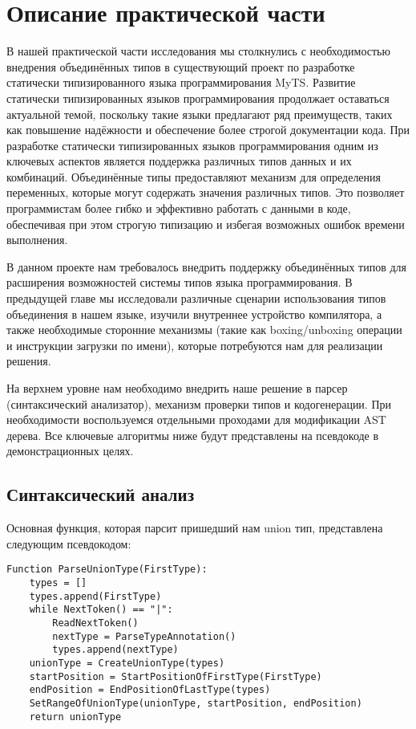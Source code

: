 \section{Описание практической части}
\label{sec:Chapter4} 

В нашей практической части исследования мы столкнулись с необходимостью внедрения объединённых типов в существующий
проект по разработке статически типизированного языка программирования MyTS\@.
Развитие статически типизированных языков программирования продолжает оставаться актуальной темой, поскольку такие
языки предлагают ряд преимуществ, таких как повышение надёжности и обеспечение более строгой документации кода.
При разработке статически типизированных языков программирования одним из ключевых аспектов является поддержка
различных типов данных и их комбинаций.
Объединённые типы предоставляют механизм для определения переменных, которые могут содержать значения различных типов.
Это позволяет программистам более гибко и эффективно работать с данными в коде, обеспечивая при этом строгую типизацию
и избегая возможных ошибок времени выполнения.

В данном проекте нам требовалось внедрить поддержку объединённых типов для расширения возможностей системы типов языка
программирования.
В предыдущей главе мы исследовали различные сценарии использования типов объединения в нашем языке, изучили внутреннее
устройство компилятора, а также необходимые сторонние механизмы (такие как boxing/unboxing операции и инструкции
загрузки по имени), которые потребуются нам для реализации решения.

На верхнем уровне нам необходимо внедрить наше решение в парсер (синтаксический анализатор), механизм проверки типов и
кодогенерации.
При необходимости воспользуемся отдельными проходами для модификации AST дерева.
Все ключевые алгоритмы ниже будут представлены на псевдокоде в демонстрационных целях.

\subsection{Синтаксический анализ}

Основная функция, которая парсит пришедший нам union тип, представлена следующим псевдокодом:

\begin{lstlisting}
Function ParseUnionType(FirstType):
    types = []
    types.append(FirstType)
    while NextToken() == "|":
        ReadNextToken()
        nextType = ParseTypeAnnotation()
        types.append(nextType)
    unionType = CreateUnionType(types)
    startPosition = StartPositionOfFirstType(FirstType)
    endPosition = EndPositionOfLastType(types)
    SetRangeOfUnionType(unionType, startPosition, endPosition)
    return unionType
\end{lstlisting}

